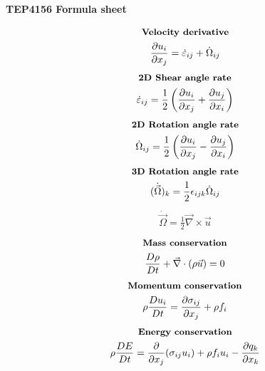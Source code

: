 \documentclass[10pt, a4paper]{article}
\newcommand{\derivative}[2]{\frac{\partial #1}{\partial #2}}
\begin{document}
\begin{center}
    \Large
    \textbf{TEP4156 Formula sheet}
    \vspace{0.5cm}
\end{center}

\begin{multicols*}{2}
    \begin{gather*}
        \textbf{\small Velocity derivative} \\
        \derivative{ u_i}{x_j} = \dot{\varepsilon}_{ij} + \dot{\Omega}_{ij}
    \end{gather*}
    \begin{gather*}
        \textbf{\small 2D Shear angle rate} \\
        \dot{\varepsilon}_{ij} = \frac12\left( \derivative{ u_i}{x_j} +
        \derivative{ u_j}{x_i}\right)
    \end{gather*}
    \begin{gather*}
        \textbf{\small 2D Rotation angle rate} \\
        \dot{\Omega}_{ij} = \frac12\left( \derivative{ u_i}{x_j} -
        \derivative{ u_j}{x_i}\right)
    \end{gather*}
    \begin{gather*}
        \textbf{\small 3D Rotation angle rate} \\
        (\dot{\vec{\Omega}})_k = \frac12 \epsilon_{ijk}\dot{\Omega}_{ij}
    \end{gather*}
    \begin{gather*}
        \dot{\vec{\Omega}} = \frac12 \vec{\nabla}\times\vec{u}
    \end{gather*}
    \begin{gather*}
        \textbf{\small Mass conservation} \\
        \frac{D\rho}{Dt} + \vec{\nabla} \cdot (\rho \vec{u}) = 0
    \end{gather*}
    \begin{gather*}
        \textbf{\small Momentum conservation} \\
        \rho \frac{Du_i}{Dt} = \derivative{ \sigma_{ij}}{x_j} + \rho f_i
    \end{gather*}
    \begin{gather*}
        \textbf{\small Energy conservation} \\
        \rho \frac{DE}{Dt} = \derivative{}{x_j}(\sigma_{ij} u_i) + \rho f_i u_i - \derivative{ q_k}{x_k}
    \end{gather*}
    \begin{gather*}

\end{gather*}
\end{multicols*}
\end{document}
